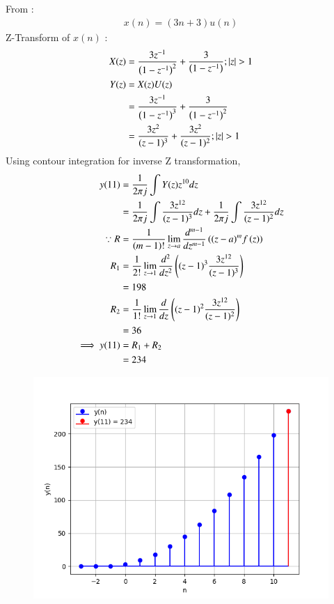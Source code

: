 \documentclass[journal,12pt,twocolumn]{IEEEtran}
\theoremstyle{remark}
\begin{document}
From :
\begin{align}
    x(n) = (3n+3)u(n)
\end{align}
Z-Transform of $x(n)$ : 
\begin{align}
    X(z) &= \frac{3z^{-1}}{\left(1-z^{-1}\right)^2} + \frac{3}{\left(1-z^{-1}\right)} ;|z| > 1\\
 Y(z) &= X(z)U(z)\\
  &= \frac{3z^{-1}}{\left(1-z^{-1}\right)^3} + \frac{3}{\left(1-z^{-1}\right)^2}\\
    &= \frac{3z^{2}}{(z-1)^3} + \frac{3z^2}{(z - 1)^2};|z| > 1
    \end{align}
Using contour integration for inverse Z transformation,
\begin{align}
  y(11) &= \frac{1}{2\pi j}\int Y(z) z^{10} dz \\
         &= \frac{1}{2\pi j}\int \frac{3z^{12}}{(z-1)^{3}} dz + \frac{1}{2\pi j}\int \frac{3z^{12}}{(z-1)^{2}} dz\\
        \because R&=\frac{1}{\left(m-1\right)!}\lim\limits_{z\to a}\frac{d^{m-1}}{dz^{m-1}}\left({(z-a)}^{m}f\left(z\right)\right)\\
        R_1 &=\frac{1}{2!}\lim\limits_{z\to 1}\frac{d^2}{dz^2}\left((z-1)^3\frac{3z^{12}}{(z-1)^{3}}\right)\\
        &= 198\\
        R_2 &=\frac{1}{1!}\lim\limits_{z\to 1}\frac{d}{dz}\left((z-1)^2\frac{3z^{12}}{(z-1)^{2}}\right)\\
        &= 36\\
        \implies y(11) &= R_1 + R_2 \\
        &= 234   
\end{align}

\begin{figure}[htbp]
    \centering
    \includegraphics[width = \columnwidth]{figs/y(n)plot.png}
  \caption{}
    \label{fig:graph1}
\end{figure}

% 
\end{document}
